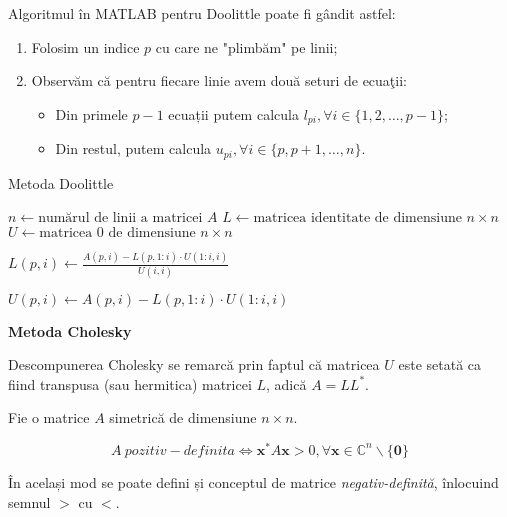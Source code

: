 \documentclass{exam}
\newcommand{\octavescript}[2]{
	
}
\begin{document}
Algoritmul în MATLAB pentru Doolittle poate fi gândit astfel:
\begin{enumerate}
	\item Folosim un indice $p$ cu care ne "plimbăm" pe linii;
	\item Observăm că pentru fiecare linie avem două seturi de ecuaţii:
	      \begin{itemize}
		      \item Din primele $p - 1$ ecuații putem calcula $l_{pi}, \forall i \in \{1, 2, \ldots, p - 1\}$;
		      \item Din restul, putem calcula $u_{pi}, \forall i \in \{p, p + 1, \ldots, n\}$.
	      \end{itemize}
\end{enumerate}

\newpage

\begin{algorithm}
	\caption{Metoda Doolittle}
	\begin{algorithmic}[1]
		\State \( n \gets \text{numărul de linii a matricei } A \)
		\State \( L \gets \text{matricea identitate de dimensiune } n \times n \)
		\State \( U \gets \text{matricea 0 de dimensiune } n \times n \)

		\State \( L(p, i) \gets \frac{A(p, i) - L(p, 1:i) \cdot U(1:i, i)}{U(i, i)} \)
		\EndFor

		\State \( U(p, i) \gets A(p, i) - L(p, 1:i) \cdot U(1:i, i) \)
		\EndFor
		\EndFor
	\end{algorithmic}
\end{algorithm}

\textbf{Metoda Cholesky}

\par Descompunerea Cholesky se remarcă prin faptul că matricea $U$ este setată
ca fiind transpusa (sau hermitica) matricei $L$, adică $A = LL^*$.

\par Fie o matrice $A$ simetrică de dimensiune $n \times n$.

\begin{equation*}
	A \ pozitiv-definita \Leftrightarrow \mathbf{x}^* A \mathbf{x} > 0, \forall \mathbf{x} \in \mathbb{C}^n \backslash \{\mathbf{0}\}
\end{equation*}

\par În același mod se poate defini și conceptul de matrice
\textit{negativ-definită}, înlocuind semnul $>$ cu $<$.
\end{document}
